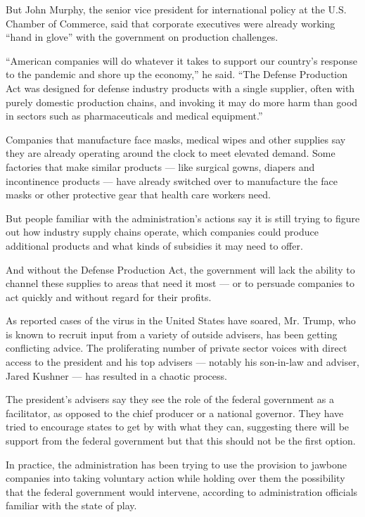 But John Murphy, the senior vice president for international policy at
the U.S. Chamber of Commerce, said that corporate executives were
already working ``hand in glove'' with the government on production
challenges.

``American companies will do whatever it takes to support our country's
response to the pandemic and shore up the economy,'' he said. ``The
Defense Production Act was designed for defense industry products with a
single supplier, often with purely domestic production chains, and
invoking it may do more harm than good in sectors such as
pharmaceuticals and medical equipment.''

Companies that manufacture face masks, medical wipes and other supplies
say they are already operating around the clock to meet elevated demand.
Some factories that make similar products --- like surgical gowns,
diapers and incontinence products --- have already switched over to
manufacture the face masks or other protective gear that health care
workers need.

But people familiar with the administration's actions say it is still
trying to figure out how industry supply chains operate, which companies
could produce additional products and what kinds of subsidies it may
need to offer.

And without the Defense Production Act, the government will lack the
ability to channel these supplies to areas that need it most --- or to
persuade companies to act quickly and without regard for their profits.

As reported cases of the virus in the United States have soared, Mr.
Trump, who is known to recruit input from a variety of outside advisers,
has been getting conflicting advice. The proliferating number of private
sector voices with direct access to the president and his top advisers
--- notably his son-in-law and adviser, Jared Kushner --- has resulted
in a chaotic process.

The president's advisers say they see the role of the federal government
as a facilitator, as opposed to the chief producer or a national
governor. They have tried to encourage states to get by with what they
can, suggesting there will be support from the federal government but
that this should not be the first option.

In practice, the administration has been trying to use the provision to
jawbone companies into taking voluntary action while holding over them
the possibility that the federal government would intervene, according
to administration officials familiar with the state of play.

